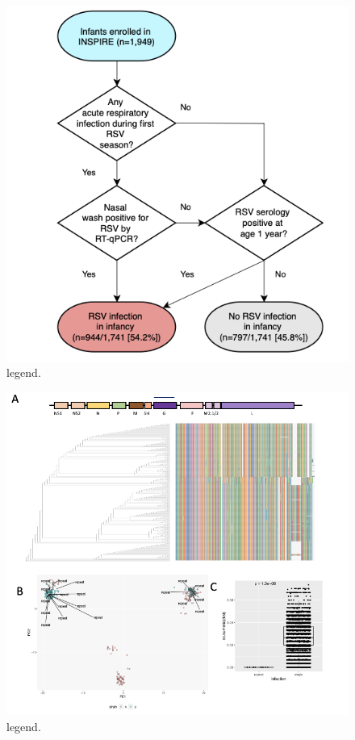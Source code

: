 \documentclass{article}
\begin{document}
\begin{figure}[ht] \hspace*{0cm} %
    \includegraphics[scale=0.2]{f1}
	\caption{legend.}
	\label{fig:1}
\end{figure}

\begin{figure}[ht] \hspace*{0cm}
    \includegraphics[scale=0.4]{f2}
	\caption{legend.}
	\label{fig:2} \end{figure}
\end{document}

